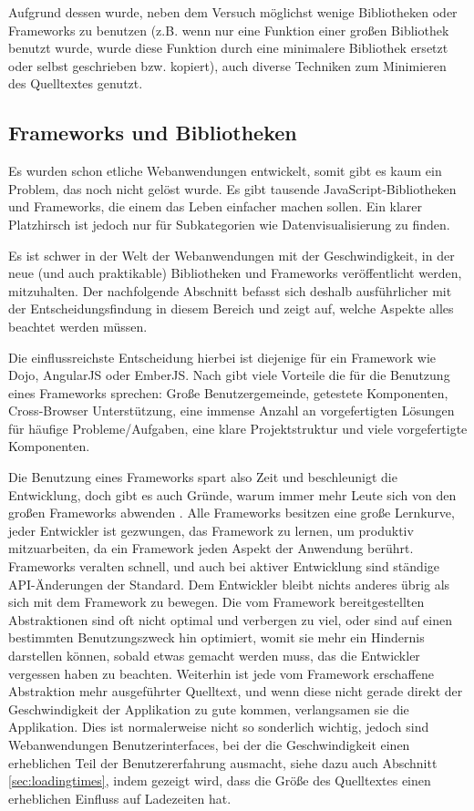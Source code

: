 \documentclass[12pt,twoside]{book}
\begin{document}
Aufgrund dessen wurde, neben dem Versuch möglichst wenige Bibliotheken oder Frameworks zu benutzen (z.B. wenn nur eine Funktion einer großen Bibliothek benutzt wurde, wurde diese Funktion durch eine minimalere Bibliothek ersetzt oder selbst geschrieben bzw. kopiert), auch diverse Techniken zum Minimieren des Quelltextes genutzt.

\subsection{Frameworks und Bibliotheken}

Es wurden schon etliche Webanwendungen entwickelt, somit gibt es kaum ein Problem, das noch nicht gelöst wurde. Es gibt tausende JavaScript-Bibliotheken und Frameworks, die einem das Leben einfacher machen sollen. Ein klarer Platzhirsch ist jedoch nur für Subkategorien wie Datenvisualisierung zu finden.

Es ist schwer in der Welt der Webanwendungen mit der Geschwindigkeit, in der neue (und auch praktikable) Bibliotheken und Frameworks veröffentlicht werden, mitzuhalten. Der nachfolgende Abschnitt befasst sich deshalb ausführlicher mit der Entscheidungsfindung in diesem Bereich und zeigt auf, welche Aspekte alles beachtet werden müssen.

Die einflussreichste Entscheidung hierbei ist diejenige für ein Framework wie Dojo\cite{dojo}, AngularJS\cite{angularjs} oder EmberJS\cite{emberjs}.
Nach \cite{prosandcons} gibt viele Vorteile die für die Benutzung eines Frameworks sprechen: Große Benutzergemeinde, getestete Komponenten, Cross-Browser Unterstützung, eine immense Anzahl an vorgefertigten Lösungen für häufige Probleme/Aufgaben, eine klare Projektstruktur und viele vorgefertigte Komponenten.

Die Benutzung eines Frameworks spart also Zeit und beschleunigt die Entwicklung, doch gibt es auch Gründe, warum immer mehr Leute sich von den großen Frameworks abwenden \cite{nomoreframeworks, frameworkless}.
Alle Frameworks besitzen eine große Lernkurve, jeder Entwickler ist gezwungen, das Framework zu lernen, um produktiv mitzuarbeiten, da ein Framework jeden Aspekt der Anwendung berührt. Frameworks veralten schnell, und auch bei aktiver Entwicklung sind ständige API-Änderungen der Standard. Dem Entwickler bleibt nichts anderes übrig als sich mit dem Framework zu bewegen. Die vom Framework bereitgestellten Abstraktionen sind oft nicht optimal und verbergen zu viel, oder sind auf einen bestimmten Benutzungszweck hin optimiert, womit sie mehr ein Hindernis darstellen können, sobald etwas gemacht werden muss, das die Entwickler vergessen haben zu beachten.
Weiterhin ist jede vom Framework erschaffene Abstraktion mehr ausgeführter Quelltext, und wenn diese nicht gerade direkt der Geschwindigkeit der Applikation zu gute kommen, verlangsamen sie die Applikation. Dies ist normalerweise nicht so sonderlich wichtig, jedoch sind Webanwendungen Benutzerinterfaces, bei der die Geschwindigkeit einen erheblichen Teil der Benutzererfahrung ausmacht, siehe dazu auch Abschnitt \ref{sec:loadingtimes}, indem gezeigt wird, dass die Größe des Quelltextes einen erheblichen Einfluss auf Ladezeiten hat.
\end{document}
